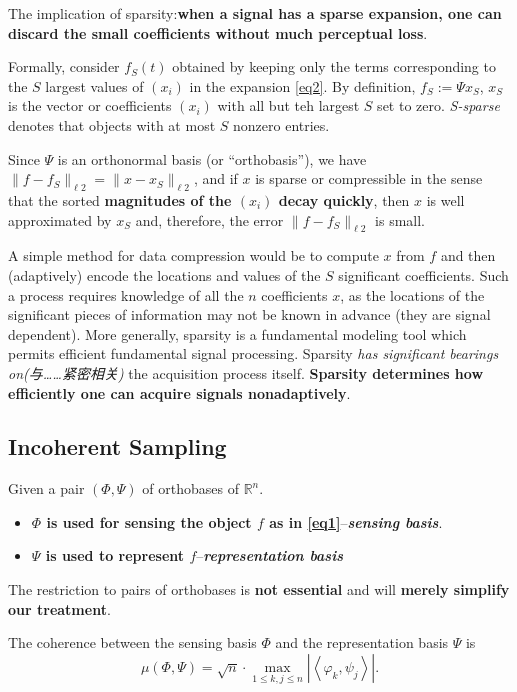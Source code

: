 The implication of sparsity:\textbf{when a signal has a sparse expansion, one can discard the small coefficients without much perceptual loss}.

Formally, consider $f_S(t)$ obtained by keeping only the terms corresponding to the $S$ largest values of $(x_i)$ in the expansion \cref{eq2}. By definition, $f_S:=\Psi x_S$, $x_S$ is the vector or coefficients $(x_i)$ with all but teh largest $S$ set to zero. \emph{S-sparse} denotes that objects with at most $S$ nonzero entries.

Since $\Psi$ is an orthonormal basis (or ``orthobasis''), we have $\parallel f-f_S \parallel_{\ell2}=\parallel x-x_S\parallel_{\ell2}$, and if $x$ is sparse or compressible in the sense that the sorted \textbf{magnitudes of the $(x_i)$ decay quickly}, then $x$ is well approximated by $x_S$ and, therefore, \textcolor[rgb]{1,0,0}{the error $\parallel f-f_S \parallel_{\ell2}$ is small}.

A simple method for data compression would be to compute $x$ from $f$ and then (adaptively) encode the locations and values of the $S$ significant coefficients. Such a process requires knowledge of all the $n$ coefficients $x$, as the locations of the significant pieces of information may not be known in advance (they are signal dependent). More generally, sparsity is a fundamental modeling tool which permits efficient fundamental signal processing. Sparsity \emph{has significant bearings on(与……紧密相关)} the acquisition process itself. \textcolor[rgb]{1,0,0}{\textbf{Sparsity determines how efficiently one can acquire signals nonadaptively}}.


\subsection{Incoherent Sampling}
Given a pair $(\Phi,\Psi)$ of orthobases of $\mathbb{R}^n$.
\begin{itemize}
	\item \textbf{$\Phi$ is used for sensing the object $f$ as in \cref{eq1}}--\textcolor[rgb]{1,0,0}{\emph{\textbf{sensing basis}}}.
	\item \textbf{$\Psi$ is used to represent $f$}--\textcolor[rgb]{1,0,0}{\emph{\textbf{representation basis}}}
\end{itemize}
The restriction to pairs of orthobases is \textbf{not essential} and will \textbf{merely simplify our treatment}.
\begin{definition}
	\label{def1.1}
	The coherence between  the sensing basis $\Phi$ and the representation basis $\Psi$ is
	\begin{equation}
	\label{eq1.3}
	\mu(\Phi,\Psi)=\sqrt{n}\cdot \max_{1 \leq k,j \leq n}\left|\left< \varphi_k,\psi_j \right>\right|.
	\end{equation}
\end{definition}

